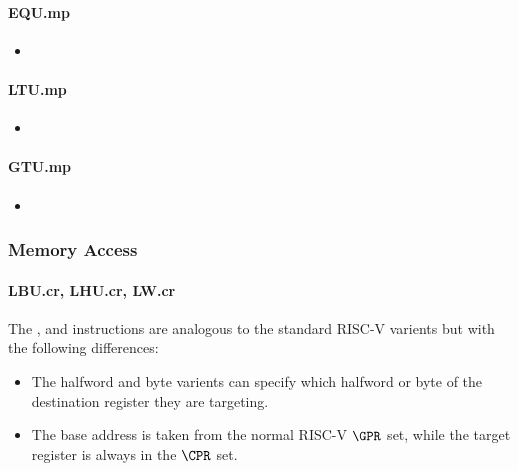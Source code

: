 \paragraph{EQU.mp}

\begin{itemize}
\item {}
\end{itemize}

\paragraph{LTU.mp}

\begin{itemize}
\item {}
\end{itemize}

\paragraph{GTU.mp}

\begin{itemize}
\item {}
\end{itemize}

\subsubsection{Memory Access}

\paragraph{LBU.cr, LHU.cr, LW.cr}

The ,  and  instructions are analogous to
the standard RISC-V varients but with the following differences:

\begin{itemize}
\item The halfword and byte varients can specify which halfword or byte of
      the destination register they are targeting.
\item The base address is taken from the normal RISC-V $\GPR$ set, while the
      target register is always in the $\CPR$ set.
\end{itemize}

